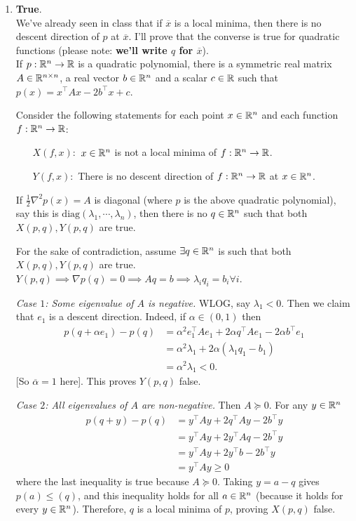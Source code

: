 \soln

\begin{enumerate}[leftmargin=*]
\item \textbf{True}.\\
We've already seen in class that if $\overline x$ is a local minima, then there is no descent direction of $p$ at $\overline x$. I'll prove that the converse is true for quadratic functions (please note: \textbf{we'll write $q$ for $\overline x$}). \\
If $p:\mathbb{R}^n\to \mathbb{R}$ is a quadratic polynomial, there is a symmetric real matrix $A\in \mathbb{R}^{n\times n}$, a real vector $b\in\mathbb{R}^n$ and a scalar $c\in \mathbb{R}$ such that $p(x) = x^\top Ax - 2b^\top x + c$. 

Consider the following statements for each point $x\in \mathbb{R}^n$ and each function $f:\mathbb{R}^n\to \mathbb{R}$:
\begin{itemize}[leftmargin=1in]
\item[$X(f,x):$] $x\in\mathbb{R}^n$ is not a local minima of $f:\mathbb{R}^n\to \mathbb{R}$.
\item[$Y(f,x):$] There is no descent direction of $f:\mathbb{R}^n\to \mathbb{R}$ at $x\in\mathbb{R}^n$.
\end{itemize}

\begin{lemma}\label{diag}
If $\frac{1}{2}\nabla^2 p(x) = A$ is diagonal (where $p$ is the above quadratic polynomial), say this is $\text{diag}(\lambda_1,\cdots,\lambda_n)$, then there is no $q\in\mathbb{R}^n$ such that both $X(p,q),Y(p,q)$ are true.
\end{lemma}
\begin{pf}
For the sake of contradiction, assume $\exists q\in\mathbb{R}^n$ is such that both $X(p,q),Y(p,q)$ are true. $Y(p,q)\implies \nabla p(q) = 0\implies Aq=b\implies \lambda_iq_i=b_i\forall i$.

\textit{Case $1$: Some eigenvalue of $A$ is negative.} WLOG, say $\lambda_1<0$. Then we claim that $e_1$ is a descent direction. Indeed, if $\alpha\in (0,1)$ then \begin{align*}
p(q+\alpha e_1)-p(q) &= \alpha^2 e_1^\top Ae_1 + 2\alpha q^\top Ae_1 - 2\alpha b^\top e_1 \\
&= \alpha^2 \lambda_1 + 2\alpha(\lambda_1 q_1 - b_1) \\
&= \alpha^2 \lambda_1 < 0.\end{align*}
[So $\overline \alpha=1$ here]. This proves $Y(p,q)$ false.

\textit{Case $2$: All eigenvalues of $A$ are non-negative.} Then $A\succeq 0$. For any $y\in\mathbb{R}^n$
\begin{align*}
p(q+y)-p(q) &= y^\top A y + 2q^\top Ay -2b^\top y \\
&= y^\top A y + 2y^\top Aq -2b^\top y \\
&= y^\top A y + 2y^\top b -2b^\top y \\
&= y^\top Ay \geq 0\end{align*} where the last inequality is true because $A\succeq 0.$
Taking $y=a-q$ gives $p(a)\leq (q)$, and this inequality holds for all $a\in\mathbb{R}^n$ (because it holds for every $y\in\mathbb{R}^n$). Therefore, $q$ is a local minima of $p$, proving $X(p,q)$ false.


\end{pf}
\end{enumerate}
